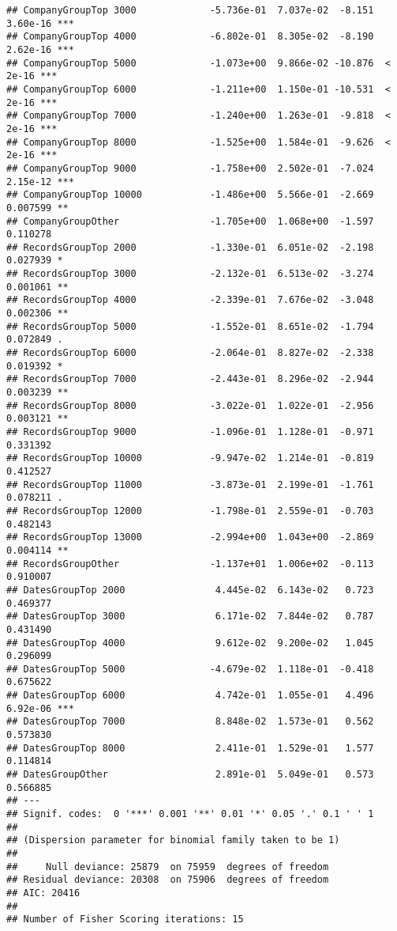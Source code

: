\documentclass[
]{article}
\begin{document}
\begin{verbatim}
## CompanyGroupTop 3000             -5.736e-01  7.037e-02  -8.151 3.60e-16 ***
## CompanyGroupTop 4000             -6.802e-01  8.305e-02  -8.190 2.62e-16 ***
## CompanyGroupTop 5000             -1.073e+00  9.866e-02 -10.876  < 2e-16 ***
## CompanyGroupTop 6000             -1.211e+00  1.150e-01 -10.531  < 2e-16 ***
## CompanyGroupTop 7000             -1.240e+00  1.263e-01  -9.818  < 2e-16 ***
## CompanyGroupTop 8000             -1.525e+00  1.584e-01  -9.626  < 2e-16 ***
## CompanyGroupTop 9000             -1.758e+00  2.502e-01  -7.024 2.15e-12 ***
## CompanyGroupTop 10000            -1.486e+00  5.566e-01  -2.669 0.007599 ** 
## CompanyGroupOther                -1.705e+00  1.068e+00  -1.597 0.110278    
## RecordsGroupTop 2000             -1.330e-01  6.051e-02  -2.198 0.027939 *  
## RecordsGroupTop 3000             -2.132e-01  6.513e-02  -3.274 0.001061 ** 
## RecordsGroupTop 4000             -2.339e-01  7.676e-02  -3.048 0.002306 ** 
## RecordsGroupTop 5000             -1.552e-01  8.651e-02  -1.794 0.072849 .  
## RecordsGroupTop 6000             -2.064e-01  8.827e-02  -2.338 0.019392 *  
## RecordsGroupTop 7000             -2.443e-01  8.296e-02  -2.944 0.003239 ** 
## RecordsGroupTop 8000             -3.022e-01  1.022e-01  -2.956 0.003121 ** 
## RecordsGroupTop 9000             -1.096e-01  1.128e-01  -0.971 0.331392    
## RecordsGroupTop 10000            -9.947e-02  1.214e-01  -0.819 0.412527    
## RecordsGroupTop 11000            -3.873e-01  2.199e-01  -1.761 0.078211 .  
## RecordsGroupTop 12000            -1.798e-01  2.559e-01  -0.703 0.482143    
## RecordsGroupTop 13000            -2.994e+00  1.043e+00  -2.869 0.004114 ** 
## RecordsGroupOther                -1.137e+01  1.006e+02  -0.113 0.910007    
## DatesGroupTop 2000                4.445e-02  6.143e-02   0.723 0.469377    
## DatesGroupTop 3000                6.171e-02  7.844e-02   0.787 0.431490    
## DatesGroupTop 4000                9.612e-02  9.200e-02   1.045 0.296099    
## DatesGroupTop 5000               -4.679e-02  1.118e-01  -0.418 0.675622    
## DatesGroupTop 6000                4.742e-01  1.055e-01   4.496 6.92e-06 ***
## DatesGroupTop 7000                8.848e-02  1.573e-01   0.562 0.573830    
## DatesGroupTop 8000                2.411e-01  1.529e-01   1.577 0.114814    
## DatesGroupOther                   2.891e-01  5.049e-01   0.573 0.566885    
## ---
## Signif. codes:  0 '***' 0.001 '**' 0.01 '*' 0.05 '.' 0.1 ' ' 1
## 
## (Dispersion parameter for binomial family taken to be 1)
## 
##     Null deviance: 25879  on 75959  degrees of freedom
## Residual deviance: 20308  on 75906  degrees of freedom
## AIC: 20416
## 
## Number of Fisher Scoring iterations: 15
\end{verbatim}
\end{document}
